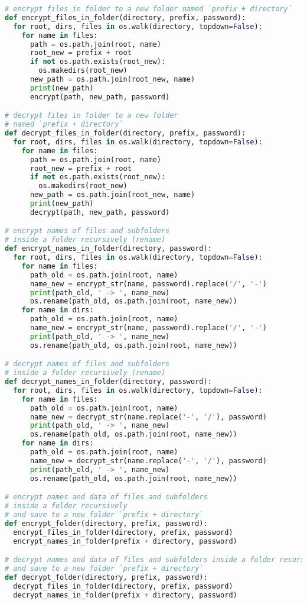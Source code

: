 \begin{lstlisting}[language=python]
# encrypt files in folder to a new folder named `prefix + directory`
def encrypt_files_in_folder(directory, prefix, password):
  for root, dirs, files in os.walk(directory, topdown=False):
    for name in files:
      path = os.path.join(root, name)
      root_new = prefix + root
      if not os.path.exists(root_new):
        os.makedirs(root_new)
      new_path = os.path.join(root_new, name)
      print(new_path)
      encrypt(path, new_path, password)

# decrypt files in folder to a new folder
# named `prefix + directory`
def decrypt_files_in_folder(directory, prefix, password):
  for root, dirs, files in os.walk(directory, topdown=False):
    for name in files:
      path = os.path.join(root, name)
      root_new = prefix + root
      if not os.path.exists(root_new):
        os.makedirs(root_new)
      new_path = os.path.join(root_new, name)
      print(new_path)
      decrypt(path, new_path, password)

# encrypt names of files and subfolders
# inside a folder recursively (rename)
def encrypt_names_in_folder(directory, password):
  for root, dirs, files in os.walk(directory, topdown=False):
    for name in files:
      path_old = os.path.join(root, name)
      name_new = encrypt_str(name, password).replace('/', '-')
      print(path_old, ' -> ', name_new)
      os.rename(path_old, os.path.join(root, name_new))
    for name in dirs:
      path_old = os.path.join(root, name)
      name_new = encrypt_str(name, password).replace('/', '-')
      print(path_old, ' -> ', name_new)
      os.rename(path_old, os.path.join(root, name_new))

# decrypt names of files and subfolders
# inside a folder recursively (rename)
def decrypt_names_in_folder(directory, password):
  for root, dirs, files in os.walk(directory, topdown=False):
    for name in files:
      path_old = os.path.join(root, name)
      name_new = decrypt_str(name.replace('-', '/'), password)
      print(path_old, ' -> ', name_new)
      os.rename(path_old, os.path.join(root, name_new))
    for name in dirs:
      path_old = os.path.join(root, name)
      name_new = decrypt_str(name.replace('-', '/'), password)
      print(path_old, ' -> ', name_new)
      os.rename(path_old, os.path.join(root, name_new))

# encrypt names and data of files and subfolders
# inside a folder recursively
# and save to a new folder `prefix + directory`
def encrypt_folder(directory, prefix, password):
  encrypt_files_in_folder(directory, prefix, password)
  encrypt_names_in_folder(prefix + directory, password)

# decrypt names and data of files and subfolders inside a folder recursively
# and save to a new folder `prefix + directory`
def decrypt_folder(directory, prefix, password):
  decrypt_files_in_folder(directory, prefix, password)
  decrypt_names_in_folder(prefix + directory, password)
\end{lstlisting}
